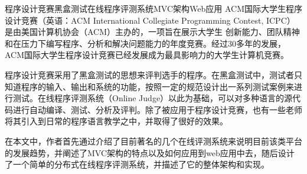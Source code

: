 
\begin{Cabstract}{程序设计竞赛}{黑盒测试}{在线程序评测系统}{MVC架构}{Web应用}
ACM国际大学生程序设计竞赛（英语：ACM International Collegiate Programming Contest, ICPC）是由美国计算机协会（ACM）主办的，一项旨在展示大学生 创新能力、团队精神和在压力下编写程序、分析和解决问题能力的年度竞赛。经过30多年的发展，ACM国际大学生程序设计竞赛已经发展成为最具影响力的大学生计算机竞赛。

程序设计竞赛采用了黑盒测试的思想来评判选手的程序。在黑盒测试中，测试者只知道程序的输入、输出和系统的功能，按照一定的规范设计出一系列测试案例来进行测试。在线程序评测系统（Online Judge）以此为基础，可以对多种语言的源代码进行自动编译、测试、分析及评判。除了被应用于程序设计竞赛，也有一些老师将其引入到日常的程序语言教学之中，并取得了很好的效果。

在本文中，作者首先通过介绍了目前著名的几个在线评测系统来说明目前该类平台的发展趋势，并阐述了MVC架构的特点以及如何应用到web应用中去，随后设计了一个简单的分布式在线程序评测系统，并描述了它的整体架构和实现。
\end{Cabstract}
